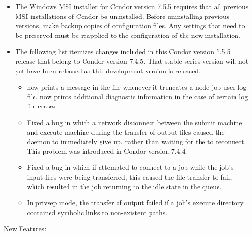 \begin{itemize}
\item The Windows MSI installer for Condor version 7.5.5 requires that 
  all previous
  MSI installations of Condor be uninstalled.  Before uninstalling
  previous versions, make backup copies of configuration files.  
  Any settings that
  need to be preserved must be reapplied to the configuration of the
  new installation.

\item The following list itemizes changes included in this Condor version
  7.5.5 release that belong to Condor version 7.4.5.  That stable series
  version will not yet have been released as this development version 
  is released.
  \begin{itemize}

  \item {} now prints a message in the  file
  whenever it truncates a node job user log file.
   now prints additional diagnostic information in the
  case of certain log file errors.

  \item Fixed a bug in which
  a network disconnect between the submit machine and execute
  machine during the transfer of output files caused the
   daemon to immediately give up, rather than waiting
  for the  to reconnect.  This problem was introduced
  in Condor version 7.4.4.

  \item Fixed a bug in which
  if  attempted to connect to a job while the
  job's input files were being transferred, this caused the file
  transfer to fail, which resulted in the job returning to the idle
  state in the queue.

  \item In privsep mode, the transfer of output failed if a job's execute
  directory contained symbolic links to non-existent paths.

  \end{itemize}
\end{itemize}


\noindent New Features:

